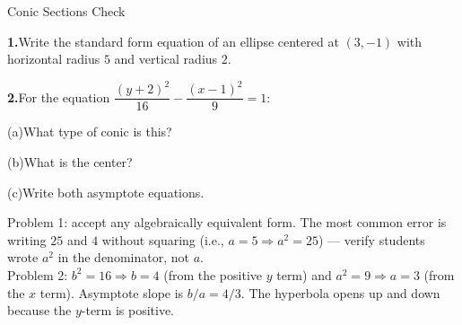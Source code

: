\documentclass[10pt]{article}
\begin{document}
\namedateperiod

\vspace{0.12in}

\begin{notesbox}{Conic Sections Check}

\textbf{1.}\quad Write the standard form equation of an ellipse centered at
$(3, -1)$ with horizontal radius $5$ and vertical radius $2$.


\vspace{0.06in}

\textbf{2.}\quad For the equation $\dfrac{(y+2)^2}{16} - \dfrac{(x-1)^2}{9} = 1$:

\vspace{4pt}
(a)\quad What type of conic is this?

(b)\quad What is the center?

(c)\quad Write both asymptote equations.


\end{notesbox}

\begin{teachernote}
Problem 1: accept any algebraically equivalent form. The most common error is
writing $25$ and $4$ without squaring (i.e., $a = 5 \Rightarrow a^2 = 25$) ---
verify students wrote $a^2$ in the denominator, not $a$.\\[3pt]
Problem 2: $b^2 = 16 \Rightarrow b = 4$ (from the positive $y$ term) and
$a^2 = 9 \Rightarrow a = 3$ (from the $x$ term). Asymptote slope is $b/a = 4/3$.
The hyperbola opens up and down because the $y$-term is positive.
\end{teachernote}
\end{document}
